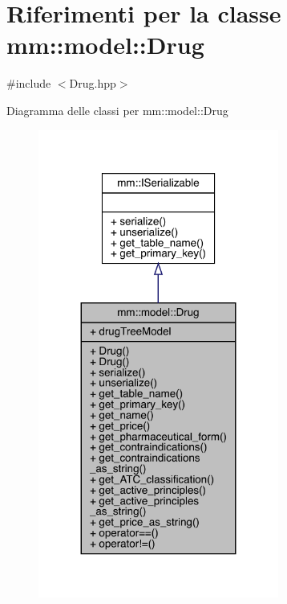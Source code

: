 \hypertarget{classmm_1_1model_1_1_drug}{}\section{Riferimenti per la classe mm\+:\+:model\+:\+:Drug}
\label{classmm_1_1model_1_1_drug}


{\ttfamily \#include $<$Drug.\+hpp$>$}



Diagramma delle classi per mm\+:\+:model\+:\+:Drug
\nopagebreak
\begin{figure}[H]
\begin{center}
\leavevmode
\includegraphics[width=224pt]{d1/d98/classmm_1_1model_1_1_drug__inherit__graph}
\end{center}
\end{figure}


